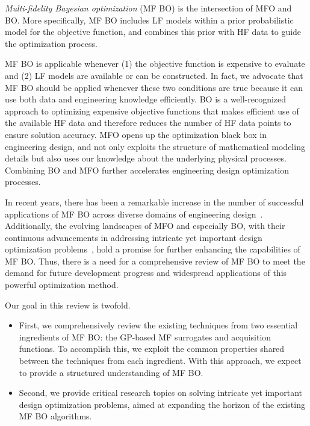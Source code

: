 \documentclass[journal ]{new-aiaa}
\begin{document}
	\textit{Multi-fidelity Bayesian optimization} (MF BO) is the intersection of MFO and BO. More specifically, MF BO includes LF models within a prior probabilistic model for the objective function, and combines this prior with HF data to guide the optimization process.
	
	MF BO is applicable whenever (1) the objective function is expensive to evaluate and (2) LF models are available or can be constructed.
	In fact, we advocate that MF BO should be applied whenever these two conditions are true because it can use both data and engineering knowledge efficiently.
	BO is a well-recognized approach to optimizing expensive objective functions that makes efficient use of the available HF data and therefore reduces the number of HF data points to ensure solution accuracy.
	MFO opens up the optimization black box in engineering design, and not only exploits the structure of mathematical modeling details but also uses our knowledge about the underlying physical processes.
	Combining BO and MFO further accelerates engineering design optimization processes.
	
	In recent years, there has been a remarkable increase in the number of successful applications of MF BO across diverse domains of engineering design~\citep[see e.g.,][]{Perdikaris2017,Meliani2019,Tran2020cise,Hebbal2021oe,Khatamsaz2021md}.
	Additionally, the evolving landscapes of MFO and especially BO, with their continuous advancements in addressing intricate yet important design optimization problems~\citep{Frazier2018,Wang2023}, hold a promise for further enhancing the capabilities of MF BO.
	Thus, there is a need for a comprehensive review of MF BO to meet the demand for future development progress and widespread applications of this powerful optimization method.
	
	Our goal in this review is twofold.
	\begin{itemize}
		\item First, we comprehensively review the existing techniques from two essential ingredients of MF BO: the GP-based MF surrogates and acquisition functions.
		To accomplish this, we exploit the common properties shared between the techniques from each ingredient.
		With this approach, we expect to provide a structured understanding of MF BO.
		
		\item Second, we provide critical research topics on solving intricate yet important design optimization problems, aimed at expanding the horizon of the existing MF BO algorithms.	
	\end{itemize} 
	
\end{document}
